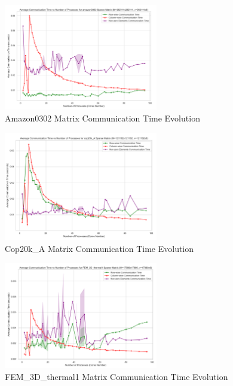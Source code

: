 \documentclass[12pt,oneside]{book} %
\begin{document}
\begin{figure}[H]
    \centering
    \includegraphics[width=0.6\textwidth]{../results/matrix_dim/amazon0302_k6_communication_time.png}
    \caption{Amazon0302 Matrix Communication Time Evolution}\label{fig:amazon0302-k6-communication-time}
\end{figure}

\begin{figure}[H]
    \centering
    \includegraphics[width=0.6\textwidth]{../results/matrix_dim/cop20k_A_k6_communication_time.png}
    \caption{Cop20k\_A Matrix Communication Time Evolution}\label{fig:cop20k-a-k6-communication-time-1}
\end{figure}

\begin{figure}[H]
    \centering
    \includegraphics[width=0.6\textwidth]{../results/matrix_dim/FEM_3D_thermal1_k6_communication_time.png}
    \caption{FEM\_3D\_thermal1 Matrix Communication Time Evolution}\label{fig:fem-3d-thermal1-k6-communication-time}
\end{figure}
\end{document}
